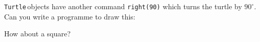 \documentclass[11pt,a4paper]{scrartcl}
\newcommand{\turtle}{\texttt{Turtle}\,}
\begin{document}
\turtle objects have another command \texttt{right(90)} which turns the turtle by $90^\circ$. Can you write a programme to draw this:
\begin{center}
\end{center}
How about a square?
\begin{center}
\end{center}
\end{document}
